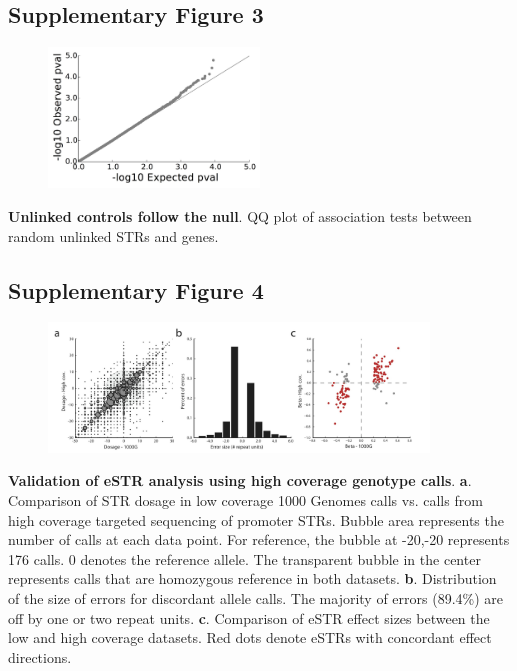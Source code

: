\pagebreak
\subsection{Supplementary Figure 3}
\begin{figure}[h!]
\centering
\label{fig:estrsupfig3}
\includegraphics[width=0.5\textwidth]{Figures/Chapter4/SuppFig3.jpg}
\end{figure}

\textbf{Unlinked controls follow the null}. QQ plot of association tests between random unlinked STRs and genes.

\pagebreak
\subsection{Supplementary Figure 4}
\begin{figure}[h!]
\centering
\label{fig:estrsupfig4}
\includegraphics[width=0.9\textwidth]{Figures/Chapter4/SuppFig4.jpg}
\end{figure}

\textbf{Validation of eSTR analysis using high coverage genotype calls}. \textbf{a}. Comparison of STR dosage in low coverage 1000 Genomes calls vs. calls from high coverage targeted sequencing of promoter STRs. Bubble area represents the number of calls at each data point. For reference, the bubble at -20,-20 represents 176 calls. 0 denotes the reference allele. The transparent bubble in the center represents calls that are homozygous reference in both datasets. \textbf{b}. Distribution of the size of errors for discordant allele calls. The majority of errors (89.4\%) are off by one or two repeat units. \textbf{c}. Comparison of eSTR effect sizes between the low and high coverage datasets. Red dots denote eSTRs with concordant effect directions.

